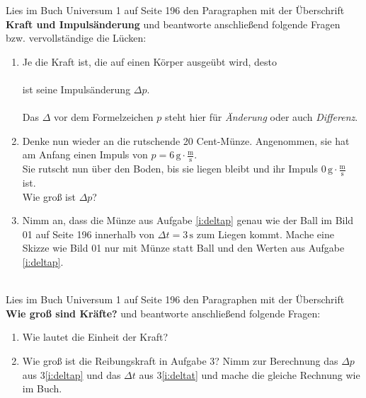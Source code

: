 \documentclass[task=1]{exercise}
\begin{document}
  Lies im Buch Universum 1 auf Seite 196 den Paragraphen mit der \"Uberschrift {\bfseries Kraft und Impuls\"anderung} und beantworte anschlie{\ss}end folgende Fragen bzw. vervollst\"andige die L\"ucken:
  \begin{enumerate}[label=\textnormal{\alph*)}]
    \item Je \luecke{3cm} die Kraft ist, die auf einen K\"orper ausge\"ubt wird, desto\\~\\
    \luecke{3cm} ist seine Impuls\"anderung $\Delta p$.\\~\\
    Das $\Delta$ vor dem Formelzeichen $p$ steht hier f\"ur \emph{\"Anderung} oder auch \emph{Differenz}.
    \item\label{i:deltap} Denke nun wieder an die rutschende 20 Cent-M\"unze. Angenommen, sie hat am Anfang einen Impuls von $p = 6\,\mathrm{g}\cdot\frac{\mathrm{m}}{\mathrm{s}}$.\\
    Sie rutscht nun \"uber den Boden, bis sie liegen bleibt und ihr Impuls $0\,\mathrm{g}\cdot\frac{\mathrm{m}}{\mathrm{s}}$ ist.\\
    Wie gro{\ss} ist $\Delta p$?\\
    \item\label{i:deltat} Nimm an, dass die M\"unze aus Aufgabe \ref{i:deltap} genau wie der Ball im Bild 01 auf Seite 196 innerhalb von $\Delta t = 3\,\mathrm{s}$ zum Liegen kommt. Mache eine Skizze wie Bild 01 nur mit M\"unze statt Ball und den Werten aus Aufgabe \ref{i:deltap}.\\\vspace{7cm}\\
  \end{enumerate}
  
  Lies im Buch Universum 1 auf Seite 196 den Paragraphen mit der \"Uberschrift {\bfseries Wie gro{\ss} sind Kr\"afte?} und beantworte anschlie{\ss}end folgende Fragen:
  \begin{enumerate}[label=\textnormal{\alph*)}]
    \item Wie lautet die Einheit der Kraft?
    \item Wie gro{\ss} ist die Reibungskraft in Aufgabe 3? Nimm zur Berechnung das $\Delta p$ aus 3\ref{i:deltap} und das $\Delta t$ aus 3\ref{i:deltat} und mache die gleiche Rechnung wie im Buch.
  \end{enumerate}
  \newpage
   
\end{document}

